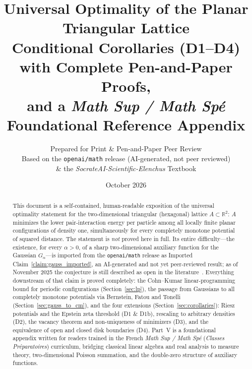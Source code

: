 \documentclass[11pt, a4paper]{article}
\title{\textbf{Universal Optimality of the Planar Triangular Lattice}\\[0.4em]
\large Conditional Corollaries (D1--D4) with Complete Pen-and-Paper Proofs,\\
and a \textit{Math Sup / Math Sp\'e} Foundational Reference Appendix}
\author{Prepared for Print \& Pen-and-Paper Peer Review\\
\small Based on the \texttt{openai/math} release (AI-generated, not peer reviewed)\\
\small \& the \textit{SocrateAI-Scientific-Elenchus} Textbook}
\date{October 2026}
\theoremstyle{definition}
\theoremstyle{remark}
\newcommand{\R}{\mathbb{R}}
\begin{document}
\maketitle

\begin{abstract}
\noindent This document is a self-contained, human-readable exposition of the universal optimality statement for the two-dimensional triangular (hexagonal) lattice $A \subset \R^2$: $A$ minimizes the lower pair-interaction energy per particle among all locally finite planar configurations of density one, simultaneously for every completely monotone potential of squared distance. The statement is \emph{not} proved here in full. Its entire difficulty---the existence, for every $\alpha > 0$, of a sharp two-dimensional auxiliary function for the Gaussian $G_\alpha$---is imported from the \texttt{openai/math} release as Imported Claim~\ref{claim:gauss_imported}, an AI-generated and not yet peer-reviewed result; as of November 2025 the conjecture is still described as open in the literature~\cite{Leble25}. Everything downstream of that claim is proved completely: the Cohn--Kumar linear-programming bound for periodic configurations (Section~\ref{sec:lp}), the passage from Gaussians to all completely monotone potentials via Bernstein, Fatou and Tonelli (Section~\ref{sec:gauss_to_cm}), and the four extensions (Section~\ref{sec:corollaries}): Riesz potentials and the Epstein zeta threshold (D1 \& D1b), rescaling to arbitrary densities (D2), the vacancy theorem and non-uniqueness of minimizers (D3), and the equivalence of open and closed disk boundaries (D4). Part~V is a foundational appendix written for readers trained in the French \textit{Math Sup / Math Sp\'e} (\textit{Classes Pr\'eparatoires}) curriculum, bridging classical linear algebra and real analysis to measure theory, two-dimensional Poisson summation, and the double-zero structure of auxiliary functions.
\end{abstract}
\end{document}

